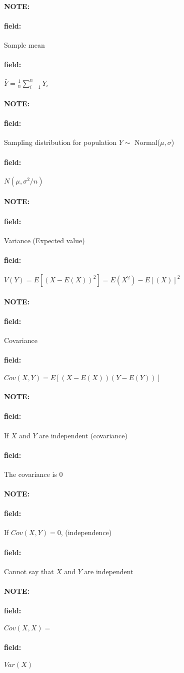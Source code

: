 \documentclass[12pt]{article}
\newenvironment{note}{\paragraph{NOTE:}}{}
\newenvironment{field}{\paragraph{field:}}{}
\begin{document}
\begin{note}
	\begin{field}
		Sample mean
	\end{field}
	\begin{field}
		$\bar{Y} = \frac{1}{n}\sum_{i=1}^n Y_i$
	\end{field}
\end{note}

\begin{note}
	\begin{field}
		Sampling distribution for population $Y \sim $ Normal($\mu,\sigma$)
	\end{field}
	\begin{field}
		$N(\mu,\sigma^2/n)$
	\end{field}
\end{note}

\begin{note}
	\begin{field}
		Variance (Expected value)
	\end{field}
	\begin{field}
		$V(Y) = E[(X - E(X))^2] = E(X^2) - E[(X)]^2$
	\end{field}
\end{note}

\begin{note}
	\begin{field}
		Covariance
	\end{field}
	\begin{field}
		$Cov(X,Y) = E[(X - E(X))(Y - E(Y))]$
	\end{field}
\end{note}

\begin{note}
	\begin{field}
		If $X$ and $Y$ are independent (covariance)
	\end{field}
	\begin{field}
		The covariance is 0
	\end{field}
\end{note}

\begin{note}
	\begin{field}
		If $Cov(X,Y) = 0$, (independence)
	\end{field}
	\begin{field}
		Cannot say that $X$ and $Y$ are independent
	\end{field}
\end{note}

\begin{note}
	\begin{field}
		$Cov(X,X) =$
	\end{field}
	\begin{field}
		$Var(X)$
	\end{field}
\end{note}
\end{document}

